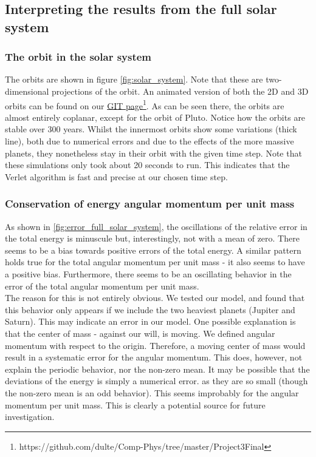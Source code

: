 \documentclass[a4paper, 10pt]{article}
\begin{document}
\subsection{Interpreting the results from the full solar system}
\subsubsection{The orbit in the solar system}
The orbits are shown in figure \cref{fig:solar_system}. Note that these are two-dimensional projections of the orbit. An animated version of both the 2D and 3D orbits can be found on our \href{https://github.com/dulte/Comp-Phys/tree/master/Project3Final}{GIT page}\footnote{https://github.com/dulte/Comp-Phys/tree/master/Project3Final}. As can be seen there, the orbits are almost entirely coplanar, except for the orbit of Pluto. Notice how the orbits are stable over 300 years. Whilst the innermost orbits show some variations (thick line), both due to numerical errors and due to the effects of the more massive planets, they nonetheless stay in their orbit with the given time step. Note that these simulations only took about 20 seconds to run. This indicates that the Verlet algorithm is fast and precise at our chosen time step.
\subsubsection{Conservation of energy angular momentum per unit mass}
As shown in \cref{fig:error_full_solar_system}, the oscillations of the relative error in the total energy is minuscule but, interestingly, not with a mean of zero. There seems to be a bias towards positive errors of the total energy. A similar pattern holds true for the total angular momentum per unit mass - it also seems to have a positive bias. Furthermore, there seems to be an oscillating behavior in the error of the total angular momentum per unit mass.\\
\linebreak
The reason for this is not entirely obvious. We tested our model, and found that this behavior only appears if we include the two heaviest planets (Jupiter and Saturn). This may indicate an error in our model. One possible explanation is that the center of mass - against our will, is moving. We defined angular momentum with respect to the origin. Therefore, a moving center of mass would result in a systematic error for the angular momentum. This does, however, not explain the periodic behavior, nor the non-zero mean. It may be possible that the deviations of the energy is simply a numerical error. as they are so small (though the non-zero mean is an odd behavior). This seems improbably for the angular momentum per unit mass. This is clearly a potential source for future investigation.
\end{document}
